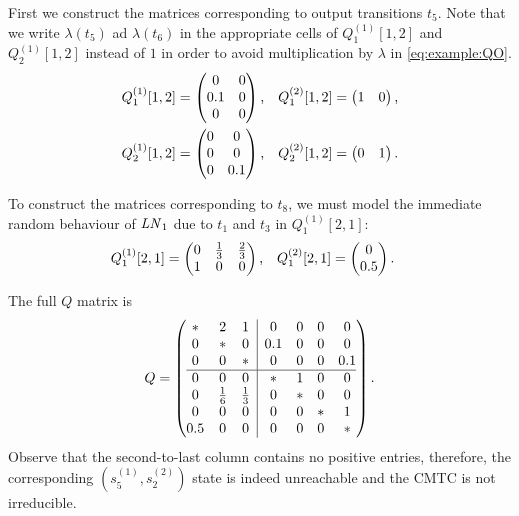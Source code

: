 \documentclass[a4paper,10pt,twoside,openright]{memoir}
\newcommand*{\LN}{\textnormal{\emph{LN}}}
\begin{document}
First we construct the matrices corresponding to output transitions
$t_5$. Note that we write $\lambda(t_5)$ ad $\lambda(t_6)$ in the
appropriate cells of $Q^{(1)}_1[1, 2]$ and $Q^{(1)}_2[1, 2]$ instead
of $1$ in order to avoid multiplication by $\lambda$ in
\eqref{eq:example:QO}.
\begin{align}
  Q^{(1)}_1[1, 2] &= \begin{pmatrix}
    0 & 0 \\
    0.1 & 0 \\
    0 & 0
  \end{pmatrix} \text, &
  Q^{(2)}_1[1, 2] &= \begin{pmatrix}
    1 & 0
  \end{pmatrix} \text, \\
  Q^{(1)}_2[1, 2] &= \begin{pmatrix}
    0 & 0 \\
    0 & 0 \\
    0 & 0.1
  \end{pmatrix} \text, &
  Q^{(2)}_2[1, 2] &= \begin{pmatrix}
    0 & 1
  \end{pmatrix} \text. \\
\end{align}

To construct the matrices corresponding to $t_8$, we must model the
immediate random behaviour of $\LN_1$ due to $t_1$ and $t_3$ in
$Q^{(1)}_1[2, 1]$:
\begin{align}
  Q^{(1)}_1[2, 1] &= \begin{pmatrix}
    0 & \frac{1}{3} & \frac{2}{3} \\
    1 & 0 & 0
  \end{pmatrix} \text, &
  Q^{(2)}_1[2, 1] &= \begin{pmatrix}
    0 \\
    0.5
  \end{pmatrix} \text.
\end{align}

The full $Q$ matrix is
\begin{equation}
  Q = \left( \begin{array}{@{}ccc|cccc@{}}
               * & 2 & 1 & 0 & 0 & 0 & 0 \\
               0 & * & 0 & 0.1 & 0 & 0 & 0 \\
               0 & 0 & * & 0 & 0 & 0 & 0.1 \\
               \hline
               0 & 0 & 0 & * & 1 & 0 & 0 \\
               0 & \frac{1}{6} & \frac{1}{3} & 0 & * & 0 & 0 \\
               0 & 0 & 0 & 0 & 0 & * & 1 \\
               0.5 & 0 & 0 & 0 & 0 & 0 & * \\
             \end{array} \right) \text.
\end{equation}
Observe that the second-to-last column contains no positive entries,
therefore, the corresponding $(s^{(1)}_5, s^{(2)}_2)$ state is indeed
unreachable and the CMTC is not irreducible.
\end{document}
